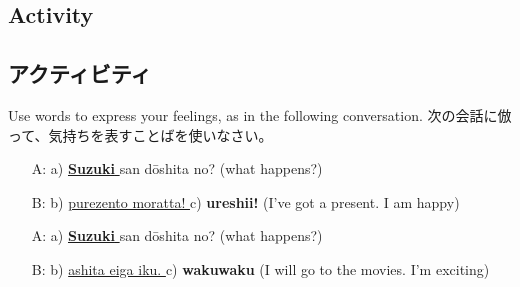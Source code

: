 \documentclass[uplatex,dvipdfmx,b5paper,english,10pt]{jsbook}
\begin{document}
\ifEnglish
\subsection{Activity}
\else
\subsection{アクティビティ}
\fi

\begin{toiquestion}
\ifEnglish
Use words to express your feelings, as in the following conversation.
\else
次の会話に倣って、気持ちを表すことばを使いなさい。
\fi
\end{toiquestion}

\begin{itemize}
 \item [A:] a) \underline{ {\bfseries Suzuki} } san d\=oshita no? (what happens?)
 \item [B:] b) \underline{ purezento moratta! } c) {\bfseries ureshii!} (I've got a present. I am happy)
 \item [A:] a) \underline{ {\bfseries Suzuki} } san d\=oshita no? (what happens?)
 \item [B:] b) \underline{ ashita eiga iku. } c) {\bfseries wakuwaku} (I will go to the movies. I'm exciting)
\end{itemize}
\end{document}
